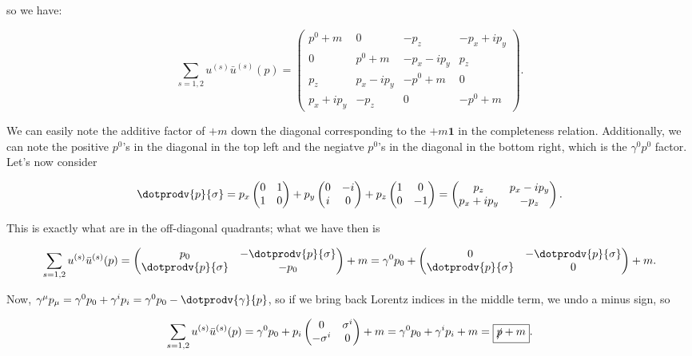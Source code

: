 so we have:

\begin{equation*}
    \sum_{s=1,2}u^{(s)}\bar{u}^{(s)}(p) = \begin{pmatrix}p^0+m & 0 & -p_z & -p_x+ip_y \\ 0 & p^0+m & -p_x-ip_y & p_z \\ p_z & p_x-ip_y & -p^0+m & 0 \\ p_x+ip_y & -p_z & 0 & -p^0+m \end{pmatrix}.
\end{equation*}

We can easily note the additive factor of $+m$ down the diagonal corresponding to the $+m \bm{1}$ in the completeness relation. Additionally, we can note the positive $p^0$'s in the diagonal in the top left and the negiatve $p^0$'s in the diagonal in the bottom right, which is the $\gamma^0p^0$ factor. Let's now consider

\begin{equation*}
    \dotprodv{p}{\sigma} = p_x\begin{pmatrix}0 & 1 \\ 1 & 0\end{pmatrix} + p_y\begin{pmatrix}0 & -i \\ i & 0\end{pmatrix} + p_z\begin{pmatrix}1 & 0 \\ 0 & -1\end{pmatrix} = \begin{pmatrix}p_z & p_x-ip_y \\ p_x+ip_y & -p_z\end{pmatrix}.
\end{equation*}

This is exactly what are in the off-diagonal quadrants; what we have then is

\begin{equation*}
    \sum_{s=1,2}u^{(s)}\bar{u}^{(s)}(p) = \begin{pmatrix}p_0 & -\dotprodv{p}{\sigma} \\ \dotprodv{p}{\sigma} & -p_0\end{pmatrix} + m = \gamma^0p_0 + \begin{pmatrix}0 & -\dotprodv{p}{\sigma} \\ \dotprodv{p}{\sigma} & 0\end{pmatrix} + m.
\end{equation*}

Now, $\gamma^{\mu}p_{\mu} = \gamma^0p_0 + \gamma^ip_i = \gamma^0p_0 - \dotprodv{\gamma}{p}$, so if we bring back Lorentz indices in the middle term, we undo a minus sign, so

\begin{equation*}
    \sum_{s=1,2}u^{(s)}\bar{u}^{(s)}(p) = \gamma^0p_0 + p_i\begin{pmatrix}0 & \sigma^i \\ -\sigma^i & 0\end{pmatrix} + m = \gamma^0p_0 + \gamma^ip_i + m = \boxed{\slashed{p} + m}.
\end{equation*}